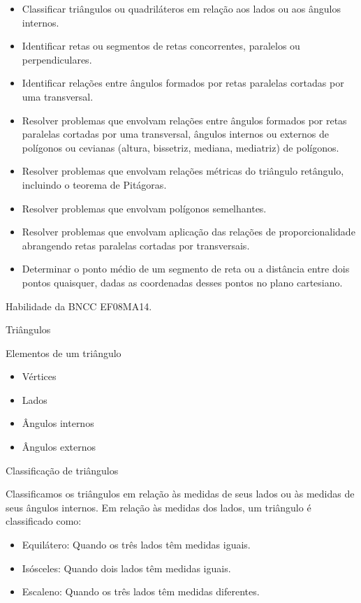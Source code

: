 \begin{itemize}
\item
  Classificar triângulos ou quadriláteros em relação aos lados ou aos
  ângulos internos.
\item
  Identificar retas ou segmentos de retas concorrentes, paralelos ou
  perpendiculares.
\item
  Identificar relações entre ângulos formados por retas paralelas
  cortadas por uma transversal.
\item
  Resolver problemas que envolvam relações entre ângulos formados por
  retas paralelas cortadas por uma transversal, ângulos internos ou
  externos de polígonos ou cevianas (altura, bissetriz, mediana,
  mediatriz) de polígonos.
\item
  Resolver problemas que envolvam relações métricas do triângulo
  retângulo, incluindo o teorema de Pitágoras.
\item
  Resolver problemas que envolvam polígonos semelhantes.
\item
  Resolver problemas que envolvam aplicação das relações de
  proporcionalidade abrangendo retas paralelas cortadas por
  transversais.
\item
  Determinar o ponto médio de um segmento de reta ou a distância entre
  dois pontos quaisquer, dadas as coordenadas desses pontos no plano
  cartesiano.
\end{itemize}

Habilidade da BNCC EF08MA14.

Triângulos

Elementos de um triângulo

\begin{itemize}
\item
  Vértices
\item
  Lados
\item
  Ângulos internos
\item
  Ângulos externos
\end{itemize}

Classificação de triângulos

Classificamos os triângulos em relação às medidas de seus lados ou às
medidas de seus ângulos internos. Em relação às medidas dos lados, um
triângulo é classificado como:

\begin{itemize}
\item
  Equilátero: Quando os três lados têm medidas iguais.
\item
  Isósceles: Quando dois lados têm medidas iguais.
\item
  Escaleno: Quando os três lados têm medidas diferentes.
\end{itemize}


